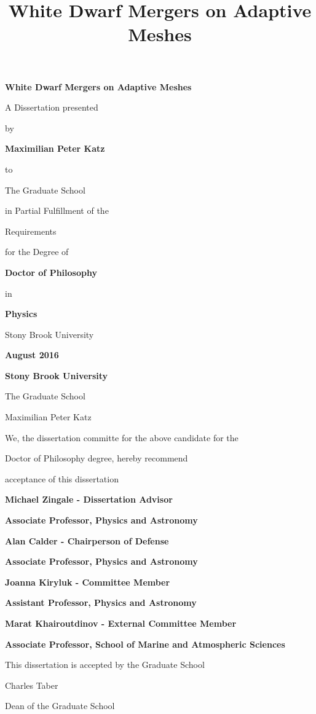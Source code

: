 \documentclass[12pt]{article}
\begin{document}
\title{\bf{White Dwarf Mergers on Adaptive Meshes}}

\vspace*{3\baselineskip}
\centerline{\bf{White Dwarf Mergers on Adaptive Meshes}}
\vspace*{1\baselineskip}
\centerline{A Dissertation presented}
\vspace*{1\baselineskip}
\centerline{by} 
\vspace*{1\baselineskip}
\centerline{\bf{Maximilian Peter Katz}}
\vspace*{1\baselineskip}
\centerline{to} 
\vspace*{1\baselineskip}
\centerline{The Graduate School}
\vspace*{1\baselineskip}
\centerline{in Partial Fulfillment of the}
\vspace*{1\baselineskip}
\centerline{Requirements}
\vspace*{1\baselineskip}
\centerline{for the Degree of}
\vspace*{1\baselineskip}
\centerline{\bf{Doctor of Philosophy}}
\vspace*{1\baselineskip}
\centerline{in}
\vspace*{1\baselineskip}
\centerline{\bf{Physics}}
\vspace*{2\baselineskip}
\centerline{Stony Brook University}
\vspace*{2\baselineskip}
\centerline{\bf{August 2016}}     

\newpage
{}
\setcounter{page}{2}

\centerline{\bf{Stony Brook University}}
\vspace*{1\baselineskip}
\centerline{The Graduate School}
\vspace*{2\baselineskip}
\centerline{Maximilian Peter Katz}
\vspace*{2\baselineskip}
\centerline{We, the dissertation committe for the above candidate for the}
\vspace*{1\baselineskip}
\centerline{Doctor of Philosophy degree, hereby recommend}
\vspace*{1\baselineskip}
\centerline{acceptance of this dissertation}
\vspace*{2\baselineskip}
\centerline{\bf{Michael Zingale - Dissertation Advisor}}
\centerline{\bf{Associate Professor, Physics and Astronomy}}
\vspace*{2\baselineskip}
\centerline{\bf{Alan Calder - Chairperson of Defense}}
\centerline{\bf{Associate Professor, Physics and Astronomy}}
\vspace*{2\baselineskip}
\centerline{\bf{Joanna Kiryluk - Committee Member}}
\centerline{\bf{Assistant Professor, Physics and Astronomy}} 
\vspace*{2\baselineskip}
\centerline{\bf{Marat Khairoutdinov - External Committee Member}}
\centerline{\bf{Associate Professor, School of Marine and Atmospheric Sciences}}
\vspace*{2\baselineskip}
\centerline{This dissertation is accepted by the Graduate School}
\vspace*{3\baselineskip}
\centerline{Charles Taber}
\centerline{Dean of the Graduate School}
\end{document}
